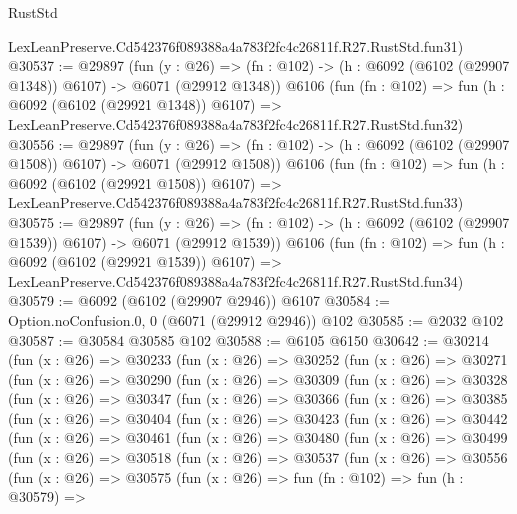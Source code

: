 \begin{lexlean}{RustStd}
\begin{coremodule}
    LexLeanPreserve.Cd542376f089388a4a783f2fc4c26811f.R27.RustStd.fun31)
@30537 := @29897
    (fun (y : @26) =>
    (fn : @102) -> (h : @6092 (@6102 (@29907 @1348)) @6107) -> @6071 (@29912 @1348))
    @6106
    (fun (fn : @102) =>
    fun (h : @6092 (@6102 (@29921 @1348)) @6107) =>
    LexLeanPreserve.Cd542376f089388a4a783f2fc4c26811f.R27.RustStd.fun32)
@30556 := @29897
    (fun (y : @26) =>
    (fn : @102) -> (h : @6092 (@6102 (@29907 @1508)) @6107) -> @6071 (@29912 @1508))
    @6106
    (fun (fn : @102) =>
    fun (h : @6092 (@6102 (@29921 @1508)) @6107) =>
    LexLeanPreserve.Cd542376f089388a4a783f2fc4c26811f.R27.RustStd.fun33)
@30575 := @29897
    (fun (y : @26) =>
    (fn : @102) -> (h : @6092 (@6102 (@29907 @1539)) @6107) -> @6071 (@29912 @1539))
    @6106
    (fun (fn : @102) =>
    fun (h : @6092 (@6102 (@29921 @1539)) @6107) =>
    LexLeanPreserve.Cd542376f089388a4a783f2fc4c26811f.R27.RustStd.fun34)
@30579 := @6092 (@6102 (@29907 @2946)) @6107
@30584 := Option.noConfusion.{0, 0} (@6071 (@29912 @2946)) @102
@30585 := @2032 @102
@30587 := @30584 @30585 @102
@30588 := @6105 @6150
@30642 := @30214
    (fun (x : @26) =>
    @30233
      (fun (x : @26) =>
      @30252
        (fun (x : @26) =>
        @30271
          (fun (x : @26) =>
          @30290
            (fun (x : @26) =>
            @30309
              (fun (x : @26) =>
              @30328
                (fun (x : @26) =>
                @30347
                  (fun (x : @26) =>
                  @30366
                    (fun (x : @26) =>
                    @30385
                      (fun (x : @26) =>
                      @30404
                        (fun (x : @26) =>
                        @30423
                          (fun (x : @26) =>
                          @30442
                            (fun (x : @26) =>
                            @30461
                              (fun (x : @26) =>
                              @30480
                                (fun (x : @26) =>
                                @30499
                                  (fun (x : @26) =>
                                  @30518
                                    (fun (x : @26) =>
                                    @30537
                                      (fun (x : @26) =>
                                      @30556
                                        (fun (x : @26) =>
                                        @30575
                                          (fun (x : @26) =>
                                          fun (fn : @102) =>
                                          fun (h : @30579) =>

\end{coremodule}
\end{lexlean}
